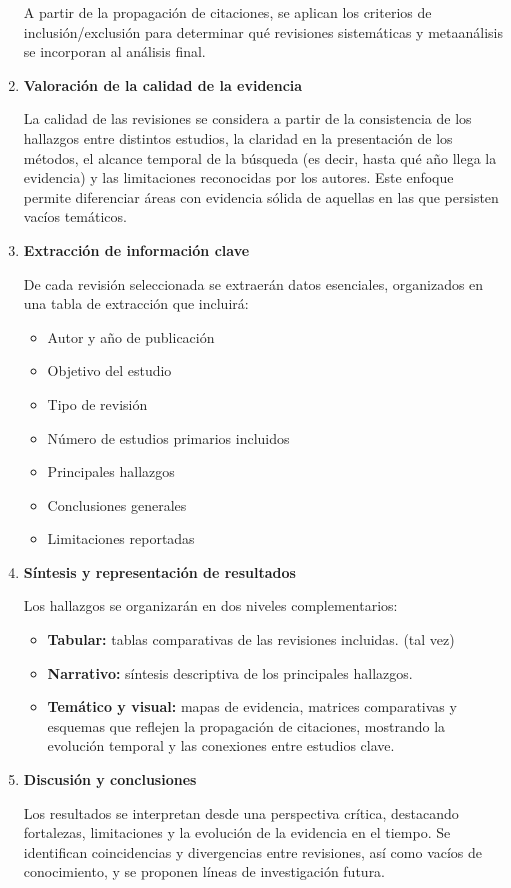 \begin{enumerate}
    A partir de la propagación de citaciones, se aplican los criterios de inclusión/exclusión para determinar qué revisiones sistemáticas y metaanálisis se incorporan al análisis final.

    \item \textbf{Valoración de la calidad de la evidencia}  

    La calidad de las revisiones se considera a partir de la consistencia de los hallazgos entre distintos estudios, la claridad en la presentación de los métodos, el alcance temporal de la búsqueda (es decir, hasta qué año llega la evidencia) y las limitaciones reconocidas por los autores. Este enfoque permite diferenciar áreas con evidencia sólida de aquellas en las que persisten vacíos temáticos.

    \item \textbf{Extracción de información clave}  

    De cada revisión seleccionada se extraerán datos esenciales, organizados en una tabla de extracción que incluirá:  
    \begin{itemize}
        \item Autor y año de publicación  
        \item Objetivo del estudio  
        \item Tipo de revisión  
        \item Número de estudios primarios incluidos  
        \item Principales hallazgos  
        \item Conclusiones generales  
        \item Limitaciones reportadas  
    \end{itemize}

    \item \textbf{Síntesis y representación de resultados}  

    Los hallazgos se organizarán en dos niveles complementarios:  
    \begin{itemize}
        \item \textbf{Tabular:} tablas comparativas de las revisiones incluidas.  (tal vez)
        \item \textbf{Narrativo:} síntesis descriptiva de los principales hallazgos.  
        \item \textbf{Temático y visual:} mapas de evidencia, matrices comparativas y esquemas que reflejen la propagación de citaciones, mostrando la evolución temporal y las conexiones entre estudios clave.  
    \end{itemize}

    \item \textbf{Discusión y conclusiones}  

    Los resultados se interpretan desde una perspectiva crítica, destacando fortalezas, limitaciones y la evolución de la evidencia en el tiempo. Se identifican coincidencias y divergencias entre revisiones, así como vacíos de conocimiento, y se proponen líneas de investigación futura.
\end{enumerate}
